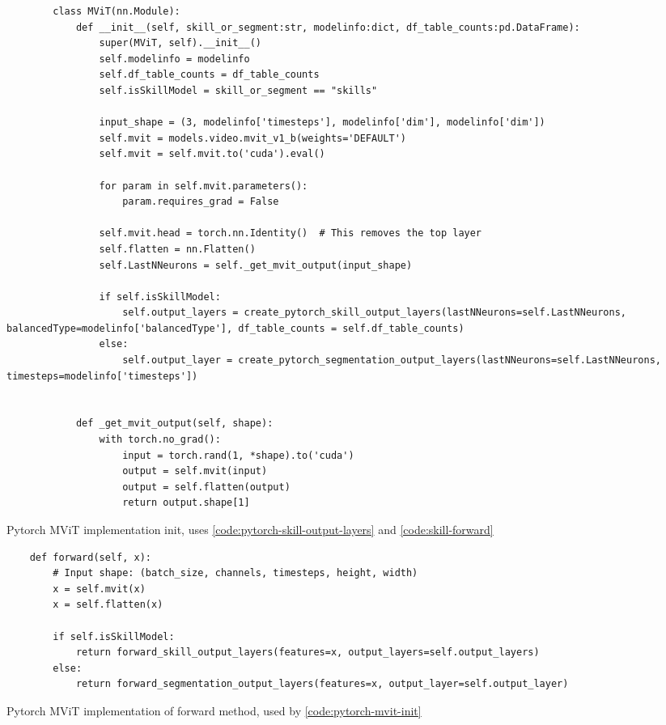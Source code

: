 \begin{listing}
    \begin{verbatim}
        class MViT(nn.Module):
            def __init__(self, skill_or_segment:str, modelinfo:dict, df_table_counts:pd.DataFrame):
                super(MViT, self).__init__()
                self.modelinfo = modelinfo
                self.df_table_counts = df_table_counts
                self.isSkillModel = skill_or_segment == "skills"
                
                input_shape = (3, modelinfo['timesteps'], modelinfo['dim'], modelinfo['dim'])
                self.mvit = models.video.mvit_v1_b(weights='DEFAULT')
                self.mvit = self.mvit.to('cuda').eval()

                for param in self.mvit.parameters():
                    param.requires_grad = False

                self.mvit.head = torch.nn.Identity()  # This removes the top layer
                self.flatten = nn.Flatten()
                self.LastNNeurons = self._get_mvit_output(input_shape)
                
                if self.isSkillModel:
                    self.output_layers = create_pytorch_skill_output_layers(lastNNeurons=self.LastNNeurons, balancedType=modelinfo['balancedType'], df_table_counts = self.df_table_counts)
                else:
                    self.output_layer = create_pytorch_segmentation_output_layers(lastNNeurons=self.LastNNeurons, timesteps=modelinfo['timesteps'])

                
            def _get_mvit_output(self, shape):
                with torch.no_grad():
                    input = torch.rand(1, *shape).to('cuda')
                    output = self.mvit(input)
                    output = self.flatten(output)
                    return output.shape[1]
    \end{verbatim}
    \caption[Pytorch MViT implementation init]{Pytorch MViT implementation init, uses \ref{code:pytorch-skill-output-layers} and \ref{code:skill-forward}}
    \label{code:pytorch-mvit-init}
\end{listing}

\begin{listing}
    \begin{verbatim}
    def forward(self, x):
        # Input shape: (batch_size, channels, timesteps, height, width)
        x = self.mvit(x)
        x = self.flatten(x)
        
        if self.isSkillModel:
            return forward_skill_output_layers(features=x, output_layers=self.output_layers)
        else:
            return forward_segmentation_output_layers(features=x, output_layer=self.output_layer)
    \end{verbatim}
    \caption[Pytorch MViT forward]{Pytorch MViT implementation of forward method, used by \ref{code:pytorch-mvit-init}}
    \label{code:pytorch-forward}
\end{listing}



